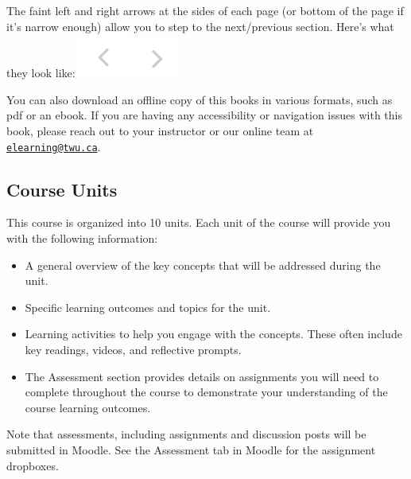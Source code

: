 \documentclass[
]{book}
\providecommand{\tightlist}{%
  \setlength{\itemsep}{0pt}\setlength{\parskip}{0pt}}
\begin{document}
The faint left and right arrows at the sides of each page (or bottom of the page if it's narrow enough) allow you to step to the next/previous section. Here's what they look like:
\includegraphics{assets/course-intro/left_arrow.png} \includegraphics{assets/course-intro/right_arrow.png}

You can also download an offline copy of this books in various formats, such as pdf or an ebook. If you are having any accessibility or navigation issues with this book, please reach out to your instructor or our online team at \href{mailto:elearning@twu.ca}{\nolinkurl{elearning@twu.ca}}.

\hypertarget{course-units}{%
\subsection*{Course Units}\label{course-units}}

This course is organized into 10 units. Each unit of the course will provide you with the following information:

\begin{itemize}
\tightlist
\item
  A general overview of the key concepts that will be addressed during the unit.\\
\item
  Specific learning outcomes and topics for the unit.\\
\item
  Learning activities to help you engage with the concepts. These often include key readings, videos, and reflective prompts.\\
\item
  The Assessment section provides details on assignments you will need to complete throughout the course to demonstrate your understanding of the course learning outcomes.
\end{itemize}

\begin{caution}
Note that assessments, including assignments and discussion posts will
be submitted in Moodle. See the Assessment tab in Moodle for the
assignment dropboxes.
\end{caution}
\end{document}
